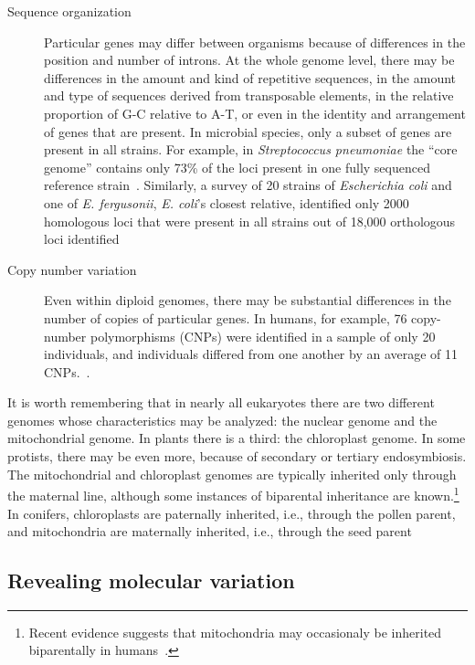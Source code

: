 \begin{description}
\item[Sequence organization] Particular genes may differ between
  organisms because of differences in the position and number of
  introns. At the whole genome level, there may be differences in the
  amount and kind of repetitive sequences, in the amount and type of
  sequences derived from transposable elements, in the relative
  proportion of G-C relative to A-T, or even in the identity and
  arrangement of genes that are present. In microbial species, only a
  subset of genes are present in all strains. For example, in {\it
    Streptococcus pneumoniae\/} the ``core genome'' contains only 73\%
  of the loci present in one fully sequenced reference
  strain~\cite{Obert-etal-2006}. Similarly, a survey of 20 strains of
  {\it Escherichia coli\/} and one of {\it E. fergusonii\/}, {\it
    E. coli\/}'s closest relative, identified only 2000 homologous
  loci that were present in all strains out of 18,000 orthologous loci
  identified~\cite{Touchon-etal-2009}

\item[Copy number variation] Even within diploid genomes, there may be
  substantial differences in the number of copies of particular
  genes. In humans, for example, 76 copy-number polymorphisms (CNPs)
  were identified in a sample of only 20 individuals, and individuals
  differed from one another by an average of 11
  CNPs.~\cite{Sebat-etal-2004}.

\end{description}

\noindent It is worth remembering that in nearly all eukaryotes there
are two different genomes whose characteristics may be analyzed: the
nuclear genome and the mitochondrial genome. In plants there is a
third: the chloroplast genome. In some protists, there may be even
more, because of secondary or tertiary endosymbiosis. The
mitochondrial and chloroplast genomes are typically inherited only
through the maternal line, although some instances of biparental
inheritance are known.\footnote{Recent evidence suggests that
  mitochondria may occasionaly be inherited biparentally in
  humans~\cite{Luo-etal-2018}.} In conifers, chloroplasts are
paternally inherited, i.e., through the pollen parent, and
mitochondria are maternally inherited, i.e., through the seed
parent~\cite{Neale-Sederoff-1988}

\subsection*{Revealing molecular variation}

